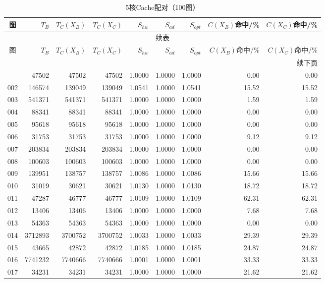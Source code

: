 \begin{longtable}{crrrrrrrr}
\caption{5核Cache配对（100图）}\label{tab:cache-detail-5}\\
\toprule
图 & $T_B$ & $T_C(X_B)$ & $T_C(X_C)$ & $S_{hw}$ & $S_{ad}$ & $S_{opt}$ & $C(X_B)$命中/\% & $C(X_C)$命中/\% \\
\midrule
\endfirsthead
\multicolumn{9}{c}{续表}\\
\toprule
图 & $T_B$ & $T_C(X_B)$ & $T_C(X_C)$ & $S_{hw}$ & $S_{ad}$ & $S_{opt}$ & $C(X_B)$命中/\% & $C(X_C)$命中/\% \\
\midrule
\endhead
\midrule\multicolumn{9}{r}{续下页}\\
\endfoot
\bottomrule
\endlastfoot
001 & 47502 & 47502 & 47502 & 1.0000 & 1.0000 & 1.0000 & 0.00 & 0.00 \\
002 & 146574 & 139049 & 139049 & 1.0541 & 1.0000 & 1.0541 & 15.52 & 15.52 \\
003 & 541371 & 541371 & 541371 & 1.0000 & 1.0000 & 1.0000 & 1.59 & 1.59 \\
004 & 88341 & 88341 & 88341 & 1.0000 & 1.0000 & 1.0000 & 0.00 & 0.00 \\
005 & 95618 & 95618 & 95618 & 1.0000 & 1.0000 & 1.0000 & 0.00 & 0.00 \\
006 & 31753 & 31753 & 31753 & 1.0000 & 1.0000 & 1.0000 & 9.12 & 9.12 \\
007 & 203834 & 203834 & 203834 & 1.0000 & 1.0000 & 1.0000 & 0.00 & 0.00 \\
008 & 100603 & 100603 & 100603 & 1.0000 & 1.0000 & 1.0000 & 0.00 & 0.00 \\
009 & 139951 & 138757 & 138757 & 1.0086 & 1.0000 & 1.0086 & 15.66 & 15.66 \\
010 & 31019 & 30621 & 30621 & 1.0130 & 1.0000 & 1.0130 & 18.72 & 18.72 \\
011 & 47287 & 46777 & 46777 & 1.0109 & 1.0000 & 1.0109 & 62.31 & 62.31 \\
012 & 13406 & 13406 & 13406 & 1.0000 & 1.0000 & 1.0000 & 7.68 & 7.68 \\
013 & 54363 & 54363 & 54363 & 1.0000 & 1.0000 & 1.0000 & 0.00 & 0.00 \\
014 & 3712893 & 3700752 & 3700752 & 1.0033 & 1.0000 & 1.0033 & 29.39 & 29.39 \\
015 & 43665 & 42872 & 42872 & 1.0185 & 1.0000 & 1.0185 & 24.87 & 24.87 \\
016 & 7741232 & 7740666 & 7740666 & 1.0001 & 1.0000 & 1.0001 & 33.33 & 33.33 \\
017 & 34231 & 34231 & 34231 & 1.0000 & 1.0000 & 1.0000 & 21.62 & 21.62 \\

\end{longtable}
